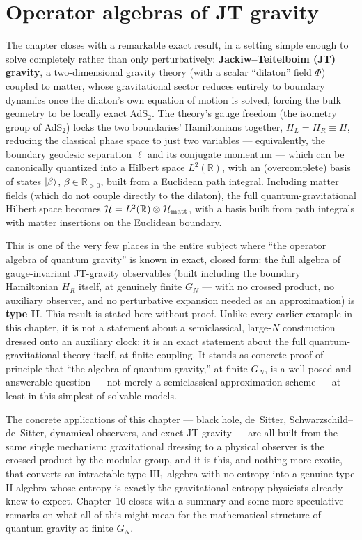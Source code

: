 \section{Operator algebras of JT gravity}

The chapter closes with a remarkable exact result, in a setting simple enough to solve completely rather than
only perturbatively: \textbf{Jackiw--Teitelboim (JT) gravity}, a two-dimensional gravity theory (with a scalar
``dilaton'' field $\Phi$) coupled to matter, whose gravitational sector reduces entirely to boundary dynamics
once the dilaton's own equation of motion is solved, forcing the bulk geometry to be locally exact AdS$_2$.
The theory's gauge freedom (the isometry group of AdS$_2$) locks the two boundaries' Hamiltonians together,
$H_L=H_R\equiv H$, reducing the classical phase space to just two variables — equivalently, the boundary
geodesic separation $\ell$ and its conjugate momentum — which can be canonically quantized into a Hilbert space
$L^2(\mathbb R)$, with an (overcomplete) basis of states $\ket\beta$, $\beta\in\mathbb R_{>0}$, built from a
Euclidean path integral. Including matter fields (which do not couple directly to the dilaton), the full
quantum-gravitational Hilbert space becomes $\mathcal{H}=L^2(\mathbb R)\otimes\mathcal{H}_{\text{matt}}$, with a basis built
from path integrals with matter insertions on the Euclidean boundary.

This is one of the very few places in the entire subject where ``the operator algebra of quantum gravity'' is
known in exact, closed form: the full algebra of gauge-invariant JT-gravity observables (built including the
boundary Hamiltonian $H_R$ itself, at genuinely finite $G_N$ — with no crossed product, no auxiliary observer,
and no perturbative expansion needed as an approximation) is \textbf{type II}. This result is stated here
without proof. Unlike every earlier example in this chapter, it is not a statement about a semiclassical,
large-$N$ construction dressed onto an auxiliary clock; it is an exact statement about the full
quantum-gravitational theory itself, at finite coupling. It stands as concrete proof of principle that ``the
algebra of quantum gravity,'' at finite $G_N$, is a well-posed and answerable question — not merely a
semiclassical approximation scheme — at least in this simplest of solvable models.

\bigskip
\noindent The concrete applications of this chapter — black hole, de~Sitter, Schwarzschild--de~Sitter,
dynamical observers, and exact JT gravity — are all built from the same single mechanism: gravitational
dressing to a physical observer is the crossed product by the modular group, and it is this, and nothing more
exotic, that converts an intractable type $\mathrm{III}_1$ algebra with no entropy into a genuine type II
algebra whose entropy is exactly the gravitational entropy physicists already knew to expect. Chapter~10
closes with a summary and some more speculative remarks on what all of this might mean for the mathematical
structure of quantum gravity at finite $G_N$.

